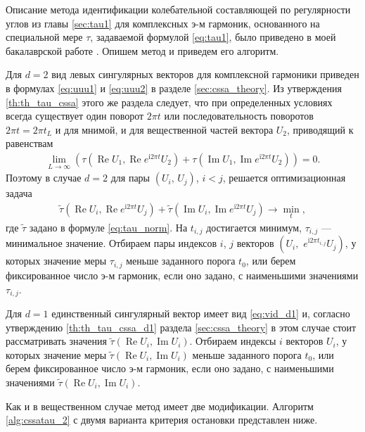 \documentclass[specialist,
               substylefile = spbu.rtx,
               subf,href,colorlinks=true, 12pt]{disser}
\def\RE{\mathop{\mathrm{Re}}}
\def\IM{\mathop{\mathrm{Im}}}
\newcommand{\I}{\mathrm{i}}
\begin{document}
Описание метода идентификации колебательной составляющей по регулярности углов из главы \ref{sec:tau1} для комплексных э-м гармоник, основанного на специальной мере $\tau$, задаваемой формулой \eqref{eq:tau1}, было приведено в моей бакалаврской работе \cite{Zhornikova2016}. Опишем метод и приведем его алгоритм.

Для $d=2$ вид левых сингулярных векторов для комплексной гармоники приведен в формулах \eqref{eq:uuu1} и \eqref{eq:uuu2} в разделе \ref{sec:cssa_theory}.
Из утверждения \ref{th:th_tau_cssa} этого же раздела следует, что при определенных условиях всегда существует один поворот $2\pi t$ или последовательность поворотов $2\pi t = 2\pi t_L$ и для мнимой, и для вещественной частей вектора $U_2$, приводящий к равенствам
\begin{gather*}
\lim_{L \rightarrow \infty}({\tau} (\RE U_1, \RE e^{\I 2\pi t} U_2) + {\tau} (\IM U_1, \IM e^{\I 2\pi t} U_2))= 0.
\end{gather*}
Поэтому в случае $d=2$ для пары $(U_i,\,U_j)$, $i<j$, решается оптимизационная задача
\begin{gather} \label{eq:cssa_tau_opt}
 \tilde{\tau}(\RE U_i, \RE e^{\I 2\pi t} U_j) + \tilde{\tau}(\IM U_i, \IM e^{\I 2\pi t} U_j) \longrightarrow \min_{t},
\end{gather}
где $\tilde{\tau}$ задано в формуле \eqref{eq:tau_norm}.
На $t_{i,j}$ достигается минимум, $\tau_{i,j}$ --- минимальное значение.
Отбираем пары индексов $i$, $j$ векторов $\left(U_i, \,\,e^{\mathrm{i} 2\pi t_{i,j}}U_j\right)$, у которых значение меры $\tau_{i,j}$
меньше заданного порога $t_0$, или берем фиксированное число э-м гармоник, если оно задано, с наименьшими значениями $\tau_{i,j}$.

Для $d=1$ единственный сингулярный вектор имеет вид \eqref{eq:vid_d1} и, согласно  утверждению \ref{th:th_tau_cssa_d1} раздела \ref{sec:cssa_theory} в этом случае стоит рассматривать значения $\tilde{\tau}(\RE U_i, \IM U_i)$.
Отбираем индексы $i$ векторов $U_i$, у которых значение меры $\tilde{\tau}(\RE U_i, \IM U_i)$
меньше заданного порога $t_0$,
или берем фиксированное число э-м гармоник, если оно задано, с наименьшими значениями $\tilde{\tau}(\RE U_i, \IM U_i)$.

Как и в вещественном случае метод имеет две модификации. Алгоритм \ref{alg:cssatau_2} с двумя варианта критерия остановки представлен ниже. 
\end{document}
